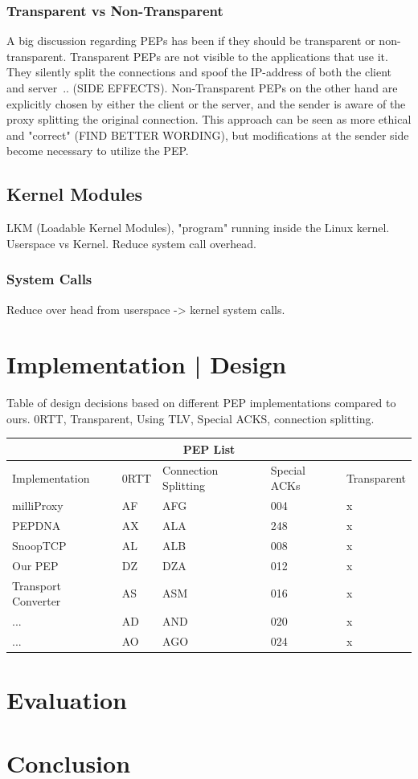 \documentclass[a4paper,english, 11pt]{report}
\begin{document}
\subsection{Transparent vs Non-Transparent}
A big discussion regarding PEPs has been if they should be transparent or non-transparent. Transparent PEPs are not visible to the applications that use it. They silently split the connections and spoof the IP-address of both the client and server~\cite{pep_dna}.. (SIDE EFFECTS). Non-Transparent PEPs on the other hand are explicitly chosen by either the client or the server, and the sender is aware of the proxy splitting the original connection. This approach can be seen as more ethical and "correct" (FIND BETTER WORDING), but modifications at the sender side become necessary to utilize the PEP.

\section{Kernel Modules}
LKM (Loadable Kernel Modules), "program" running inside the Linux kernel.
Userspace vs Kernel. Reduce system call overhead.
\subsection{System Calls}
Reduce over head from userspace -> kernel system calls.

\chapter{Implementation | Design}

{Table of design decisions based on different PEP implementations compared to ours.}
{0RTT, Transparent, Using TLV, Special ACKS, connection splitting.}\\
\begin{tabular}{ |p{4cm}||p{2cm}|p{2cm}|p{2cm}|p{2cm}| }
 \hline
 \multicolumn{5}{|c|}{PEP List} \\
 \hline
 Implementation& 0RTT &Connection Splitting &Special ACKs &Transparent\\
 \hline
 milliProxy   & AF    &AFG&   004 & x\\
 PEPDNA&   AX  & ALA   &248 & x\\
 SnoopTCP &AL & ALB&  008 & x\\
 Our PEP    &DZ & DZA&  012& x \\
 Transport Converter &   AS  & ASM&016& x\\
 ...& AD  & AND   &020& x\\
 ...& AO  & AGO&024& x\\
 \hline
\end{tabular}

\chapter{Evaluation}
\chapter{Conclusion}

{}

\end{document}
